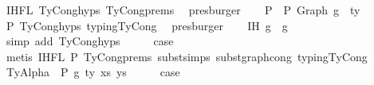 \begin{isabellebody}
\ IHFL{}\ TyCong{\isachardot}{\kern0pt}hyps{\isacharparenleft}{\kern0pt}{}{\isacharparenright}{\kern0pt}\ TyCong{\isachardot}{\kern0pt}prems{\isacharparenleft}{\kern0pt}{}{\isacharcomma}{\kern0pt}{}{\isacharcomma}{\kern0pt}{}{\isacharcomma}{\kern0pt}{}{\isacharparenright}{\kern0pt}\ \isamarkupfalse%
\ presburger\isanewline
\ \ \isamarkupfalse%
\ P{}{\isacharcolon}{\kern0pt}\ {\isachardoublequoteopen}{\isasymGamma}{\isacharprime}{\kern0pt}\ {\isasymturnstile}{\isacharbraceleft}{\kern0pt}P{\isacharbraceright}{\kern0pt}\ {\isacharparenleft}{\kern0pt}Graph\ g{}{\isacharprime}{\kern0pt}{\isacharparenright}{\kern0pt}\ {\isacharcolon}{\kern0pt}\ ty{\isacharprime}{\kern0pt}{\isachardoublequoteclose}\isanewline
\ \ \ \ \isamarkupfalse%
\ P{}\ TyCong{\isachardot}{\kern0pt}hyps{\isacharparenleft}{\kern0pt}{}{\isacharparenright}{\kern0pt}\ typing{\isachardot}{\kern0pt}TyCong\ \isamarkupfalse%
\ presburger\isanewline
\isanewline
\isanewline
\ \ \isamarkupfalse%
\ IH{\isacharcolon}{\kern0pt}\ {\isachardoublequoteopen}g{}{\isacharprime}{\kern0pt}\ {\isasymsimeq}\ g{}{\isacharprime}{\kern0pt}{\isachardoublequoteclose}\isanewline
\ \ \ \ \ \ \ \isamarkupfalse%
\ {\isacharparenleft}{\kern0pt}simp\ add{\isacharcolon}{\kern0pt}\ TyCong{\isachardot}{\kern0pt}hyps{\isacharparenleft}{\kern0pt}{}{\isacharparenright}{\kern0pt}{\isacharparenright}{\kern0pt}\isanewline
\ \ \isamarkupfalse%
\ \isamarkupfalse%
\ {\isacharquery}{\kern0pt}case\isanewline
\ \ \ \ \isamarkupfalse%
\ {\isacharparenleft}{\kern0pt}metis\ IHFL{}\ P{}\ TyCong{\isachardot}{\kern0pt}prems{\isacharparenleft}{\kern0pt}{}{\isacharparenright}{\kern0pt}\ subst{\isachardot}{\kern0pt}simps{\isacharparenleft}{\kern0pt}{}{\isacharparenright}{\kern0pt}\ subst{\isacharunderscore}{\kern0pt}graph{\isacharunderscore}{\kern0pt}cong\ typing{\isachardot}{\kern0pt}TyCong{\isacharparenright}{\kern0pt}\isanewline
{}\isamarkupfalse%
\isanewline
\ \ \isamarkupfalse%
\ {\isacharparenleft}{\kern0pt}TyAlpha\ {\isasymGamma}{}\ P\ g\ ty\ xs\ ys{\isacharparenright}{\kern0pt}\isanewline
\ \ \isamarkupfalse%
\ \isamarkupfalse%
\ {\isacharquery}{\kern0pt}case\isanewline
\ \ \ \isamarkupfalse%

\end{isabellebody}
